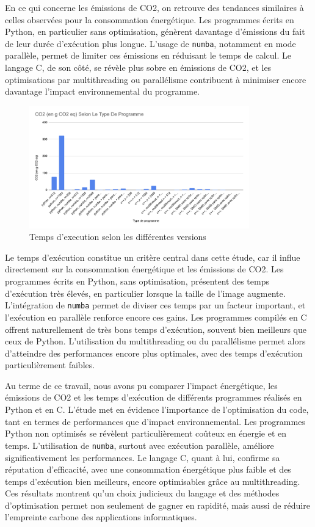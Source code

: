 En ce qui concerne les émissions de CO2, on retrouve des tendances similaires à celles observées pour la consommation énergétique. Les programmes écrits en Python, en particulier sans optimisation, génèrent davantage d’émissions du fait de leur durée d’exécution plus longue.  
L’usage de \texttt{numba}, notamment en mode parallèle, permet de limiter ces émissions en réduisant le temps de calcul.  
Le langage C, de son côté, se révèle plus sobre en émissions de CO2, et les optimisations par multithreading ou parallélisme contribuent à minimiser encore davantage l’impact environnemental du programme.


\begin{figure}[H]
    \centering
    \includegraphics[width=0.85\textwidth]{images/graph3.png}
    \caption{Temps d'execution selon les différentes versions}
\end{figure}
Le temps d’exécution constitue un critère central dans cette étude, car il influe directement sur la consommation énergétique et les émissions de CO2.  
Les programmes écrits en Python, sans optimisation, présentent des temps d’exécution très élevés, en particulier lorsque la taille de l’image augmente. L’intégration de \texttt{numba} permet de diviser ces temps par un facteur important, et l'exécution en parallèle renforce encore ces gains.  
Les programmes compilés en C offrent naturellement de très bons temps d’exécution, souvent bien meilleurs que ceux de Python. L'utilisation du multithreading ou du parallélisme permet alors d’atteindre des performances encore plus optimales, avec des temps d’exécution particulièrement faibles.

Au terme de ce travail, nous avons pu comparer l’impact énergétique, les émissions de CO2 et les temps d’exécution de différents programmes réalisés en Python et en C.
L’étude met en évidence l’importance de l’optimisation du code, tant en termes de performances que d’impact environnemental.
Les programmes Python non optimisés se révèlent particulièrement coûteux en énergie et en temps. L’utilisation de \texttt{numba}, surtout avec exécution parallèle, améliore significativement les performances.
Le langage C, quant à lui, confirme sa réputation d’efficacité, avec une consommation énergétique plus faible et des temps d’exécution bien meilleurs, encore optimisables grâce au multithreading.
Ces résultats montrent qu’un choix judicieux du langage et des méthodes d’optimisation permet non seulement de gagner en rapidité, mais aussi de réduire l’empreinte carbone des applications informatiques.